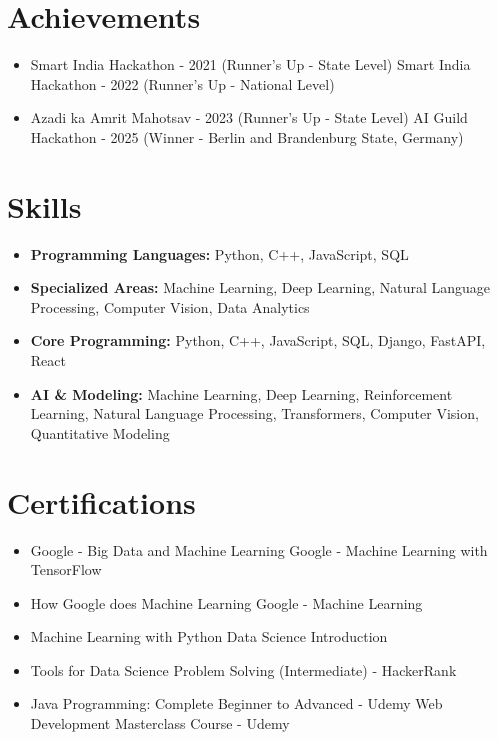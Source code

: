 \documentclass[a4paper,10pt]{article}
\begin{document}
\section*{Achievements}
\begin{itemize}
\item Smart India Hackathon - 2021 (Runner's Up - State Level) \hfill Smart India Hackathon - 2022 (Runner's Up - National Level)
\item Azadi ka Amrit Mahotsav - 2023 (Runner's Up - State Level) \hfill AI Guild Hackathon - 2025 (Winner - Berlin and Brandenburg State, Germany)
\end{itemize}

\section*{Skills}
\begin{itemize}
  \item \textbf{Programming Languages:} Python, C++, JavaScript, SQL
  \item \textbf{Specialized Areas:} Machine Learning, Deep Learning, Natural Language Processing, Computer Vision, Data Analytics
  \item \textbf{Core Programming:} Python, C++, JavaScript, SQL, Django, FastAPI, React
  \item \textbf{AI \& Modeling:} Machine Learning, Deep Learning, Reinforcement Learning, Natural Language Processing, Transformers, Computer Vision, Quantitative Modeling
\end{itemize}

\section*{Certifications}
\begin{itemize}
\item Google - Big Data and Machine Learning \hfill Google - Machine Learning with TensorFlow
\item How Google does Machine Learning \hfill Google - Machine Learning
\item Machine Learning with Python \hfill Data Science Introduction
\item Tools for Data Science \hfill Problem Solving (Intermediate) - HackerRank
\item Java Programming: Complete Beginner to Advanced - Udemy \hfill Web Development Masterclass Course - Udemy
\end{itemize}
\end{document}
